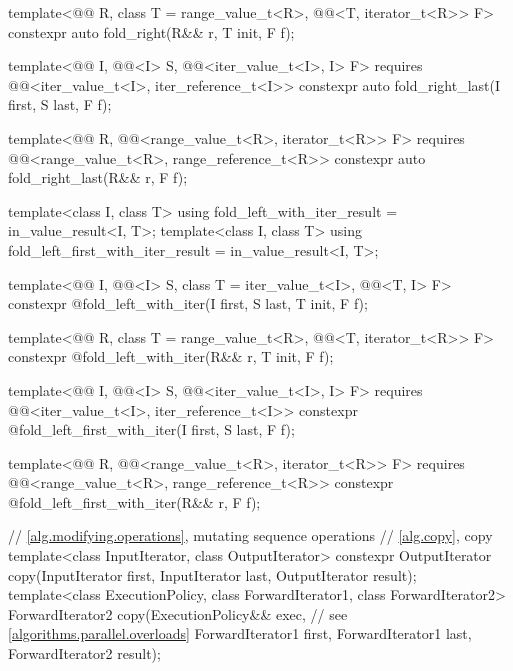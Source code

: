 \begin{codeblock}
{{    template<@@ R, class T = range_value_t<R>,
             @@<T, iterator_t<R>> F>
      constexpr auto fold_right(R&& r, T init, F f);

    template<@@ I, @@<I> S,
             @@<iter_value_t<I>, I> F>
      requires @@<iter_value_t<I>, iter_reference_t<I>>
    constexpr auto fold_right_last(I first, S last, F f);

    template<@@ R,
             @@<range_value_t<R>, iterator_t<R>> F>
      requires @@<range_value_t<R>, range_reference_t<R>>
      constexpr auto fold_right_last(R&& r, F f);

    template<class I, class T>
      using fold_left_with_iter_result = in_value_result<I, T>;
    template<class I, class T>
      using fold_left_first_with_iter_result = in_value_result<I, T>;

    template<@@ I, @@<I> S, class T = iter_value_t<I>,
             @@<T, I> F>
      constexpr @\seebelow@ fold_left_with_iter(I first, S last, T init, F f);

    template<@@ R, class T = range_value_t<R>,
             @@<T, iterator_t<R>> F>
      constexpr @\seebelow@ fold_left_with_iter(R&& r, T init, F f);

    template<@@ I, @@<I> S,
             @@<iter_value_t<I>, I> F>
      requires @@<iter_value_t<I>, iter_reference_t<I>>
      constexpr @\seebelow@ fold_left_first_with_iter(I first, S last, F f);

    template<@@ R,
             @@<range_value_t<R>, iterator_t<R>> F>
      requires @@<range_value_t<R>, range_reference_t<R>>
      constexpr @\seebelow@ fold_left_first_with_iter(R&& r, F f);
  }

  // \ref{alg.modifying.operations}, mutating sequence operations
  // \ref{alg.copy}, copy
  template<class InputIterator, class OutputIterator>
    constexpr OutputIterator copy(InputIterator first, InputIterator last,
                                  OutputIterator result);
  template<class ExecutionPolicy, class ForwardIterator1, class ForwardIterator2>
    ForwardIterator2 copy(ExecutionPolicy&& exec,               // see \ref{algorithms.parallel.overloads}
                          ForwardIterator1 first, ForwardIterator1 last,
                          ForwardIterator2 result);

}
\end{codeblock}
